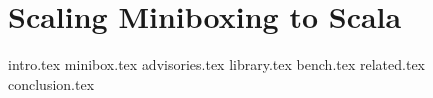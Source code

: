 \chapter{Scaling Miniboxing to Scala}
\label{chapter:mbox2}

{intro.tex}
{minibox.tex}
{advisories.tex}
{library.tex}
{bench.tex}
{related.tex}
{conclusion.tex}
